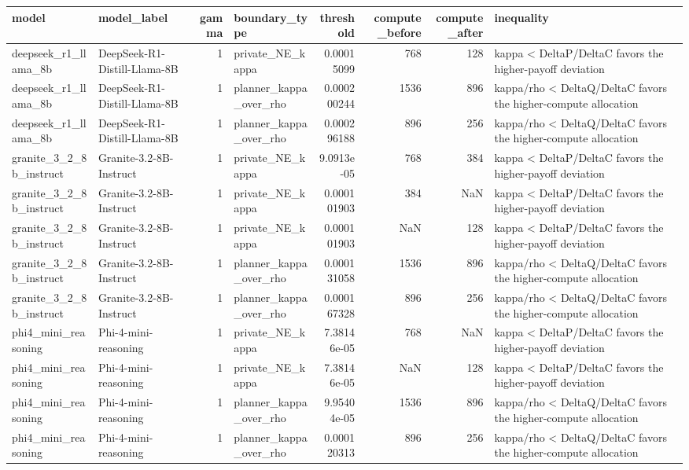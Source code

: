 \begin{tabular}{llrlrrrl}
\toprule
model & model_label & gamma & boundary_type & threshold & compute_before & compute_after & inequality \\
\midrule
deepseek_r1_llama_8b & DeepSeek-R1-Distill-Llama-8B & 1 & private_NE_kappa & 0.00015099 & 768 & 128 & kappa < DeltaP/DeltaC favors the higher-payoff deviation \\
deepseek_r1_llama_8b & DeepSeek-R1-Distill-Llama-8B & 1 & planner_kappa_over_rho & 0.000200244 & 1536 & 896 & kappa/rho < DeltaQ/DeltaC favors the higher-compute allocation \\
deepseek_r1_llama_8b & DeepSeek-R1-Distill-Llama-8B & 1 & planner_kappa_over_rho & 0.000296188 & 896 & 256 & kappa/rho < DeltaQ/DeltaC favors the higher-compute allocation \\
granite_3_2_8b_instruct & Granite-3.2-8B-Instruct & 1 & private_NE_kappa & 9.0913e-05 & 768 & 384 & kappa < DeltaP/DeltaC favors the higher-payoff deviation \\
granite_3_2_8b_instruct & Granite-3.2-8B-Instruct & 1 & private_NE_kappa & 0.000101903 & 384 & NaN & kappa < DeltaP/DeltaC favors the higher-payoff deviation \\
granite_3_2_8b_instruct & Granite-3.2-8B-Instruct & 1 & private_NE_kappa & 0.000101903 & NaN & 128 & kappa < DeltaP/DeltaC favors the higher-payoff deviation \\
granite_3_2_8b_instruct & Granite-3.2-8B-Instruct & 1 & planner_kappa_over_rho & 0.000131058 & 1536 & 896 & kappa/rho < DeltaQ/DeltaC favors the higher-compute allocation \\
granite_3_2_8b_instruct & Granite-3.2-8B-Instruct & 1 & planner_kappa_over_rho & 0.000167328 & 896 & 256 & kappa/rho < DeltaQ/DeltaC favors the higher-compute allocation \\
phi4_mini_reasoning & Phi-4-mini-reasoning & 1 & private_NE_kappa & 7.38146e-05 & 768 & NaN & kappa < DeltaP/DeltaC favors the higher-payoff deviation \\
phi4_mini_reasoning & Phi-4-mini-reasoning & 1 & private_NE_kappa & 7.38146e-05 & NaN & 128 & kappa < DeltaP/DeltaC favors the higher-payoff deviation \\
phi4_mini_reasoning & Phi-4-mini-reasoning & 1 & planner_kappa_over_rho & 9.95404e-05 & 1536 & 896 & kappa/rho < DeltaQ/DeltaC favors the higher-compute allocation \\
phi4_mini_reasoning & Phi-4-mini-reasoning & 1 & planner_kappa_over_rho & 0.000120313 & 896 & 256 & kappa/rho < DeltaQ/DeltaC favors the higher-compute allocation \\

\end{tabular}
